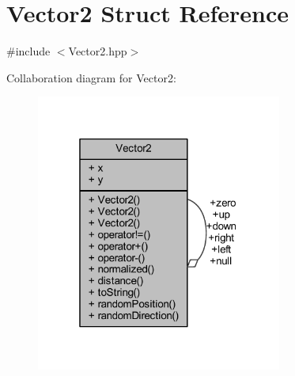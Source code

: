 \hypertarget{struct_vector2}{}\section{Vector2 Struct Reference}
\label{struct_vector2}


{\ttfamily \#include $<$Vector2.\+hpp$>$}



Collaboration diagram for Vector2\+:\nopagebreak
\begin{figure}[H]
\begin{center}
\leavevmode
\includegraphics[width=229pt]{struct_vector2__coll__graph}
\end{center}
\end{figure}

